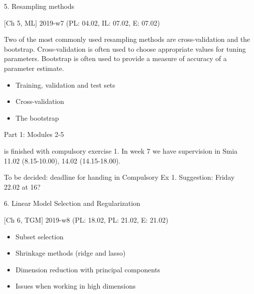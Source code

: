 \documentclass[10pt,ignorenonframetext,]{beamer}
\providecommand{\tightlist}{%
  \setlength{\itemsep}{0pt}\setlength{\parskip}{0pt}}
\begin{document}
\begin{frame}

\begin{block}{5. Resampling methods}

{[}Ch 5, ML{]} 2019-w7 (PL: 04.02, IL: 07.02, E: 07.02)

Two of the most commonly used resampling methods are cross-validation
and the bootstrap. Cross-validation is often used to choose appropriate
values for tuning parameters. Bootstrap is often used to provide a
measure of accuracy of a parameter estimate.

\begin{itemize}
\tightlist
\item
  Training, validation and test sets
\item
  Cross-validation
\item
  The bootstrap
\end{itemize}

\end{block}

\end{frame}

\begin{frame}

\begin{block}{Part 1: Modules 2-5}

is finished with compulsory exercise 1. In week 7 we have supervision in
Smia 11.02 (8.15-10.00), 14.02 (14.15-18.00).

To be decided: deadline for handing in Compulsory Ex 1. Suggestion:
Friday 22.02 at 16?

\end{block}

\end{frame}

\begin{frame}

\begin{block}{6. Linear Model Selection and Regularization}

{[}Ch 6, TGM{]} 2019-w8 (PL: 18.02, PL: 21.02, E: 21.02)

\begin{itemize}
\tightlist
\item
  Subset selection
\item
  Shrinkage methods (ridge and lasso)
\item
  Dimension reduction with principal components
\item
  Issues when working in high dimensions
\end{itemize}

\end{block}

\end{frame}
\end{document}
